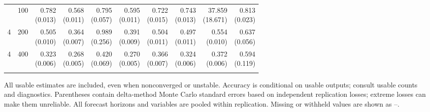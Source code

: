 \begin{table}[p]
{\begin{tabular}{llrrrrrrrr}
\addlinespace
4 & 100 & \shortstack{0.782\\(0.013)} & \shortstack{0.568\\(0.011)} & \shortstack{0.795\\(0.057)} & \shortstack{0.595\\(0.011)} & \shortstack{0.722\\(0.015)} & \shortstack{0.743\\(0.013)} & \shortstack{37.859\\(18.671)} & \shortstack{0.813\\(0.023)} \\
4 & 200 & \shortstack{0.505\\(0.010)} & \shortstack{0.364\\(0.007)} & \shortstack{0.989\\(0.256)} & \shortstack{0.391\\(0.009)} & \shortstack{0.504\\(0.011)} & \shortstack{0.497\\(0.011)} & \shortstack{0.554\\(0.010)} & \shortstack{0.637\\(0.056)} \\
4 & 400 & \shortstack{0.323\\(0.006)} & \shortstack{0.268\\(0.005)} & \shortstack{0.420\\(0.069)} & \shortstack{0.270\\(0.005)} & \shortstack{0.366\\(0.007)} & \shortstack{0.324\\(0.006)} & \shortstack{0.372\\(0.006)} & \shortstack{0.594\\(0.119)} \\
\addlinespace
\bottomrule\end{tabular}}
\par\medskip
\begin{minipage}{\linewidth}\footnotesize All usable estimates are included, even when nonconverged or unstable. Accuracy is conditional on usable outputs; consult usable counts and diagnostics. Parentheses contain delta-method Monte Carlo standard errors based on independent replication losses; extreme losses can make them unreliable. All forecast horizons and variables are pooled within replication.  Missing or withheld values are shown as --.\end{minipage}
\end{table}
